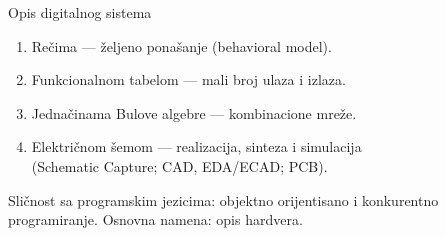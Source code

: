 \begin{frame}[label=07-s002]{Opis digitalnog sistema}
\begin{enumerate}
\item Rečima — željeno ponašanje (behavioral model).
\item Funkcionalnom tabelom — mali broj ulaza i izlaza.
\item Jednačinama Bulove algebre — kombinacione mreže.
\item Električnom šemom — realizacija, sinteza i simulacija\\
(Schematic Capture; CAD, EDA/ECAD; PCB).
\end{enumerate}
\vspace{3mm}
\vspace{2mm}
Sličnost sa programskim jezicima: objektno orijentisano i konkurentno programiranje. Osnovna namena: \alert{opis hardvera}.
\end{frame}
